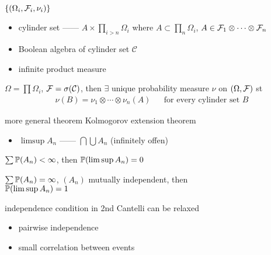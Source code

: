 \begin{setting}
    $\left\{ (\Omega_i, \mathcal{F}_i, \nu_i) \right\}$
\end{setting}

\begin{itemize}
    \item cylinder set ------ $A \times \prod_{i > n} \Omega_i$ where $A \subset \prod_{n} \Omega_i$, $A \in \mathcal{F}_1 \otimes \cdots \otimes \mathcal{F}_n$
    \item Boolean algebra of cylinder set $\mathcal{C}$
    \item infinite product measure
\end{itemize}

\begin{prop}
    $\Omega = \prod \Omega_i$, $\mathcal{F} = \sigma(\mathcal{C})$, then $\exists$ unique probability measure $\nu$ on $(\Omega, \mathcal{F})$ st
    \begin{align*}
        \nu(B) = \nu_1 \otimes \cdots \otimes \nu_n (A) && \text{for every cylinder set $B$}
    \end{align*}
\end{prop}

\begin{fact}
    more general theorem Kolmogorov extension theorem
\end{fact}

\begin{itemize}
    \item $\limsup A_n$ ------ $\bigcap \bigcup A_n$ (infinitely offen)
\end{itemize}

\begin{lemma}
    $\sum \mathbb{P}(A_n) < \infty$, then $\mathbb{P} (\limsup A_n) = 0$
\end{lemma}

\begin{lemma}
    $\sum \mathbb{P}(A_n) = \infty$, $(A_n)$ mutually independent, then \\
    $\mathbb{P} (\limsup A_n) = 1$
\end{lemma}

\begin{fact}
    independence condition in 2nd Cantelli can be relaxed
    \begin{itemize}
        \item pairwise independence
        \item small correlation between events
    \end{itemize}
\end{fact}

